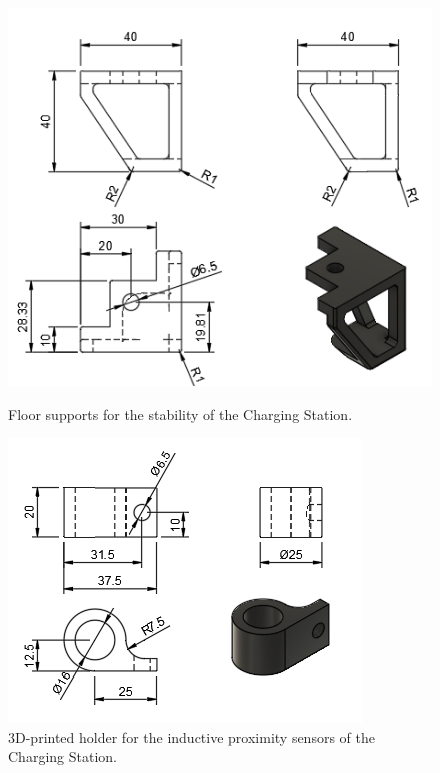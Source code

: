 \begin{figure}[H]
    \centering
    \begin{minipage}{0.45\textwidth}
        \centering
        \includegraphics[width=\textwidth]{PLANOS/PLANO_PATAS_ESTABILIDAD_CAJON.png}
        \caption{Floor supports for the stability of the Charging Station.}
        \label{fig:patas_estabilidad}
    \end{minipage}%
    \hfill
    \begin{minipage}{0.45\textwidth}
        \centering
        \includegraphics[width=\textwidth]{PLANOS/PLANO_SENSOR.png}
        \caption{3D-printed holder for the inductive proximity sensors of the Charging Station.}
        \label{fig:inductive_holder}
    \end{minipage}%
    \hfill
\end{figure}



